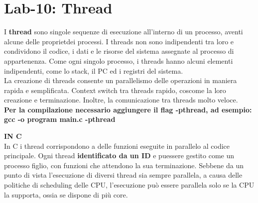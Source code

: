\section{Lab-10: Thread}
\begin{flushleft}
  I \textbf{thread} sono singole sequenze di esecuzione all'interno di un processo, aventi alcune 
  delle propriet\aca dei processi. I threads non sono indipendenti tra loro e condividono il 
  codice, i dati e le risorse del sistema assegnate al processo di appartenenza. Come 
  ogni singolo processo, i threads hanno alcuni elementi indipendenti, come lo stack, il 
  PC ed i registri del sistema.\\
  La creazione di threads consente un parallelismo delle operazioni in maniera rapida e 
  semplificata. Context switch tra threads \ace rapido, cos\aci come la loro creazione e 
  terminazione. Inoltre, la comunicazione tra threads \ace molto veloce.\\
  \textbf{Per la compilazione \ace necessario aggiungere il flag -pthread, ad esempio:
  gcc -o program main.c -pthread}
  \begin{flushleft}
    \textbf{IN C}\\
    In C i thread corrispondono a delle funzioni eseguite in parallelo al codice principale. 
    Ogni thread \ace \textbf{identificato da un ID} e pu\aco essere gestito come un processo figlio, con 
    funzioni che attendono la sua terminazione. 
    Sebbene da un punto di vista l'esecuzione di diversi thread sia sempre parallela, a 
    causa delle politiche di scheduling delle CPU, l'esecuzione può essere parallela solo 
    se la CPU la supporta, ossia se dispone di più core.
  \end{flushleft}

\end{flushleft}
